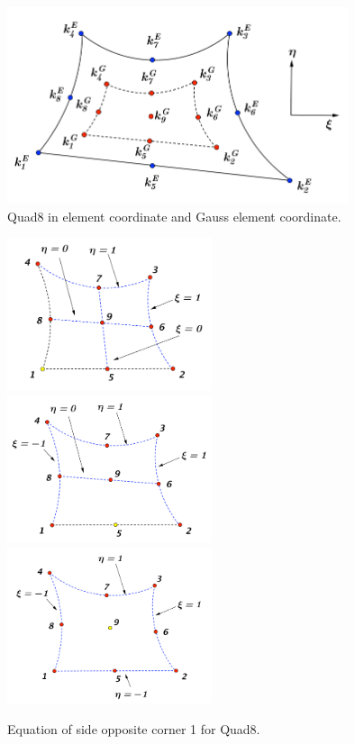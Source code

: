 \begin{figure}[h]
	\begin{center}
		\includegraphics[width=10cm,clip]{Quad8_1.pdf}			
		\caption{Quad8 in element coordinate and Gauss element coordinate.} \label{fig: Quad8_1}
	\end{center} 
\end{figure}

\begin{figure}[h]
	\begin{center}
		\includegraphics[width=6cm,clip]{Quad8_2.pdf} 
		\includegraphics[width=6cm,clip]{Quad8_3.pdf}	
		\includegraphics[width=6cm,clip]{Quad8_4.pdf}
		\caption{Equation of side opposite corner 1 for Quad8.} \label{fig: Quad8_2}	
	\end{center} 
\end{figure}


